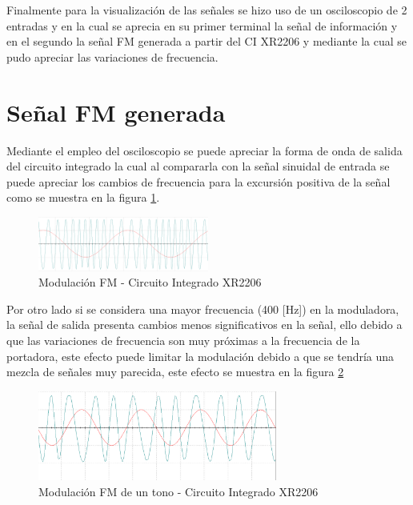 \documentclass[conference]{IEEEtran}
\begin{document}
	Finalmente para la visualización de las señales se hizo uso de un osciloscopio de 2 entradas y en la cual se aprecia en su primer terminal la señal de información y en el segundo la señal FM generada a partir del CI XR2206 y mediante la cual se pudo apreciar las variaciones de frecuencia.
	
	\section{Señal FM generada}
	
	Mediante el empleo del osciloscopio se puede apreciar la forma de onda de salida del circuito integrado la cual al compararla con la señal sinuidal de entrada se puede apreciar los cambios de frecuencia para la excursión positiva de la señal como se muestra en la figura \ref{fig:mod-fm-circuito}.
	
	\begin{figure}[h]
		\centering
		\includegraphics[width=0.5\textwidth]{media/mod-fm-circuito}
		\caption{Modulación FM - Circuito Integrado XR2206}
		\label{fig:mod-fm-circuito}
	\end{figure}
	
	Por otro lado si se considera una mayor frecuencia (400 [Hz]) en la moduladora, la señal de salida presenta cambios menos significativos en la señal, ello debido a que las variaciones de frecuencia son muy próximas a la frecuencia de la portadora, este efecto puede limitar la modulación debido a que se tendría una mezcla de señales muy parecida, este efecto se muestra en la figura \ref{fig:mod-fm-circuito-400}
	
	\begin{figure}[h]
		\centering
		\includegraphics[width=0.7\textwidth]{media/mod-fm-circuito-400}
		\caption{Modulación FM de un tono - Circuito Integrado XR2206}
		\label{fig:mod-fm-circuito-400}
	\end{figure}
	
	
	
	
\end{document}
